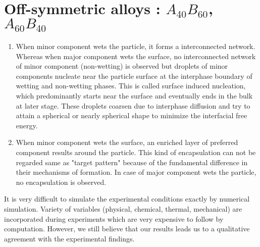 \documentclass[12pt]{iiscthes}
\theoremstyle{definition}
\theoremstyle{definition}
\theoremstyle{remark}
\begin{document}
\section*{Off-symmetric alloys : $A_{40}B_{60}$, $A_{60}B_{40}$}
\begin{enumerate}
\item
 When minor component wets the particle, it forms a interconnected network. Whereas when major component wets the surface, no interconnected network of minor component (non-wetting) is observed but droplets of minor components nucleate near the particle surface at the interphase boundary of wetting and non-wetting phases. This is called surface induced nucleation, which predominantly starts near the surface and eventually ends in the bulk at later stage. These droplets coarsen due to interphase diffusion and try to attain a spherical or nearly spherical shape to minimize the interfacial free energy. 
\item
When minor component wets the surface, an enriched layer of preferred component results around the particle. This kind of encapsulation can not be regarded same as "target pattern" because of the fundamental difference in their mechanisms of formation. In case of major component wets the particle, no encapsulation is observed. 
\end{enumerate}
It is very difficult to simulate the experimental conditions exactly by numerical simulation. Variety of variables (physical, chemical, thermal, mechanical) are incorporated during experiments which are very expensive to follow by computation. However, we still believe that our results leads us to a qualitative agreement with the experimental findings. 
\end{document}
